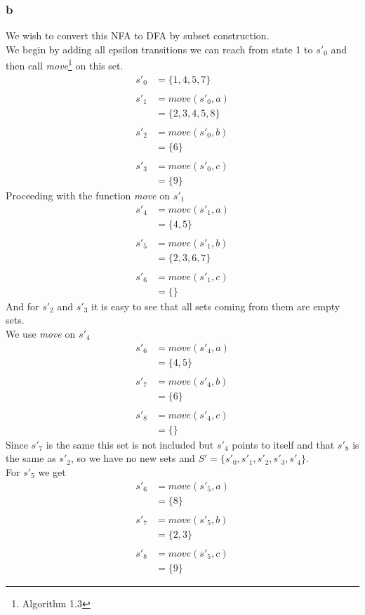 \documentclass[12pt]{article}
\begin{document}
\subsubsection*{b}
We wish to convert this NFA to DFA by subset construction.\\
We begin by adding all epsilon transitions we can reach from state 1 to $s'_0$ and then call \textit{move}\footnote{Algorithm 1.3} on this set.
\begin{align*}
 s'_0 &=\{1,4,5,7\}\\
 \\
 s'_1&=move(s'_0,a) \\
 &=\{2,3,4,5,8\} \\
 \\
 s'_2&=move(s'_0,b) \\
 &=\{6\} \\
 \\
 s'_3&=move(s'_0,c) \\
 &=\{9\}
\end{align*}
Proceeding with the function \textit{move} on $s'_1$
\begin{align*}
 s'_4&=move(s'_1,a) \\
 &=\{4,5\} \\
 \\
 s'_5&=move(s'_1,b) \\
 &=\{2,3,6,7\} \\
 \\
 s'_6&=move(s'_1,c) \\
 &=\{\}
\end{align*}
And for $s'_2$ and $s'_3$ it is easy to see that all sets coming from them are empty sets.\\
We use \textit{move} on $s'_4$
\begin{align*}
 s'_6&=move(s'_4,a) \\
 &=\{4,5\} \\
 \\
 s'_7&=move(s'_4,b) \\
 &=\{6\} \\
 \\
 s'_8&=move(s'_4,c) \\
 &=\{\}
\end{align*}
Since $s'_7$ is the same this set is not included but $s'_4$ points to itself and that $s'_8$ is the same as $s'_2$, so we have no new sets and $S'=\{s'_0,s'_1,s'_2,s'_3,s'_4\}$.\\
For $s'_5$ we get
\begin{align*}
 s'_{6}&=move(s'_5,a) \\
 &=\{8\} \\
 \\
 s'_{7}&=move(s'_5,b) \\
 &=\{2,3\} \\
 \\
 s'_{8}&=move(s'_5,c) \\
 &=\{9\}
\end{align*}
\end{document}
